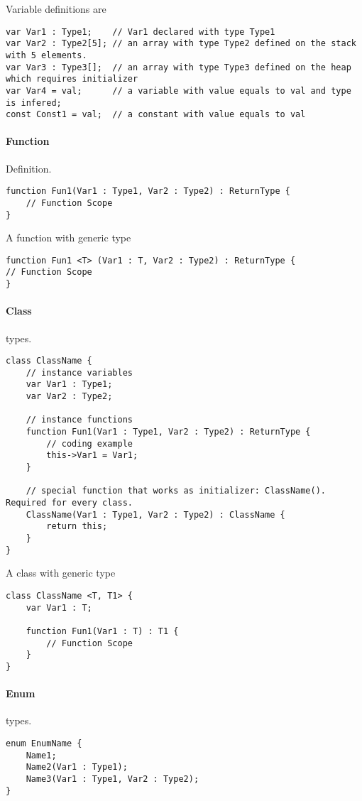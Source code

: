 \documentclass[12pt, a4paper]{IEEEtran}
\begin{document}
Variable definitions are
\begin{lstlisting}
var Var1 : Type1;    // Var1 declared with type Type1
var Var2 : Type2[5]; // an array with type Type2 defined on the stack with 5 elements.
var Var3 : Type3[];  // an array with type Type3 defined on the heap which requires initializer
var Var4 = val;      // a variable with value equals to val and type is infered;
const Const1 = val;  // a constant with value equals to val
\end{lstlisting}
\paragraph{Function}
Definition.
\begin{lstlisting}
function Fun1(Var1 : Type1, Var2 : Type2) : ReturnType {
	// Function Scope
}
\end{lstlisting}

A function with generic type
\begin{lstlisting}
function Fun1 <T> (Var1 : T, Var2 : Type2) : ReturnType {
// Function Scope
}
\end{lstlisting}
\paragraph{Class}
types.
\begin{lstlisting}
class ClassName {
	// instance variables
	var Var1 : Type1;
	var Var2 : Type2;
	
	// instance functions
	function Fun1(Var1 : Type1, Var2 : Type2) : ReturnType {
		// coding example
		this->Var1 = Var1;
	}
	
	// special function that works as initializer: ClassName(). Required for every class.
	ClassName(Var1 : Type1, Var2 : Type2) : ClassName {
		return this;
	}
}
\end{lstlisting}

A class with generic type
\begin{lstlisting}
class ClassName <T, T1> {
	var Var1 : T;
	
	function Fun1(Var1 : T) : T1 {
		// Function Scope
	}
}
\end{lstlisting}
\paragraph{Enum}
types.
\begin{lstlisting}
enum EnumName {
	Name1;
	Name2(Var1 : Type1);
	Name3(Var1 : Type1, Var2 : Type2);
}
\end{lstlisting}
\end{document}
